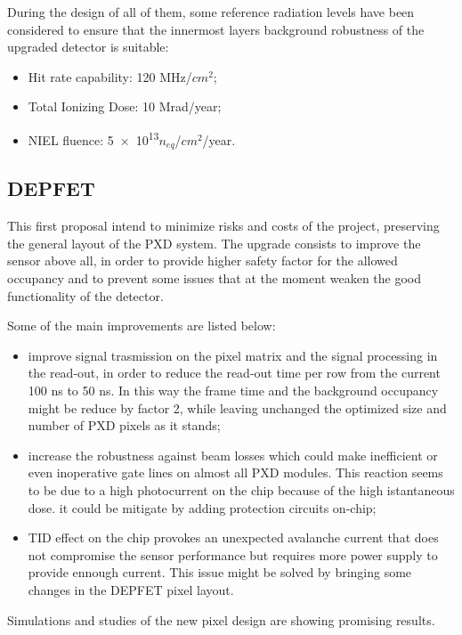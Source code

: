 During the design of all of them, some reference radiation levels have been considered to ensure that the innermost layers background robustness of the upgraded detector is suitable:

\begin{itemize}
\item Hit rate capability: 120 MHz/$cm^{2}$;
\item Total Ionizing Dose: 10 Mrad/year;
\item NIEL fluence: \num{5e13}$n_{eq}$/$cm^{2}$/year.
\end{itemize}


\subsection{DEPFET}

This first proposal intend to minimize risks and costs of the project, preserving the general layout of the PXD system. The upgrade consists to improve the sensor above all, in order to provide higher safety factor for the allowed occupancy and to prevent some issues that at the moment weaken the good functionality of the detector.

Some of the main improvements are listed below:

\begin{itemize}
\item improve signal trasmission on the pixel matrix and the signal processing in the read-out, in order to reduce the read-out time per row from the current 100 ns to 50 ns. In this way the frame time and the background occupancy might be reduce by factor 2, while leaving unchanged the optimized size and number of PXD pixels as it stands;
\item increase the robustness against beam losses which could make inefficient or even inoperative gate lines on almost all PXD modules. This reaction seems to be due to a high photocurrent on the chip because of the high istantaneous dose. it could be mitigate by adding protection circuits on-chip;
\item TID effect on the chip provokes an unexpected avalanche current that does not compromise the sensor performance but requires more power supply to provide ennough current. This issue might be solved by bringing some changes in the DEPFET pixel layout.
\end{itemize}

Simulations and studies of the new pixel design are showing promising results.


